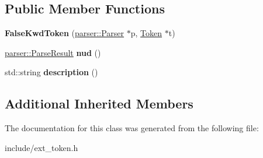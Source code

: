 \subsection*{Public Member Functions}
\begin{DoxyCompactItemize}
\item 
{\bfseries False\+Kwd\+Token} (\hyperlink{classfcal_1_1parser_1_1Parser}{parser\+::\+Parser} $\ast$p, \hyperlink{classfcal_1_1scanner_1_1Token}{Token} $\ast$t)\hypertarget{classfcal_1_1scanner_1_1FalseKwdToken_ac35ad99acd8ed526d7e7a5d5216b060e}{}\label{classfcal_1_1scanner_1_1FalseKwdToken_ac35ad99acd8ed526d7e7a5d5216b060e}

\item 
\hyperlink{classfcal_1_1parser_1_1ParseResult}{parser\+::\+Parse\+Result} {\bfseries nud} ()\hypertarget{classfcal_1_1scanner_1_1FalseKwdToken_a57566622065242fe629d5f991022cdac}{}\label{classfcal_1_1scanner_1_1FalseKwdToken_a57566622065242fe629d5f991022cdac}

\item 
std\+::string {\bfseries description} ()\hypertarget{classfcal_1_1scanner_1_1FalseKwdToken_ad03d22a5baf8377d409dcae104cfc997}{}\label{classfcal_1_1scanner_1_1FalseKwdToken_ad03d22a5baf8377d409dcae104cfc997}

\end{DoxyCompactItemize}
\subsection*{Additional Inherited Members}


The documentation for this class was generated from the following file\+:\begin{DoxyCompactItemize}
\item 
include/ext\+\_\+token.\+h\end{DoxyCompactItemize}
